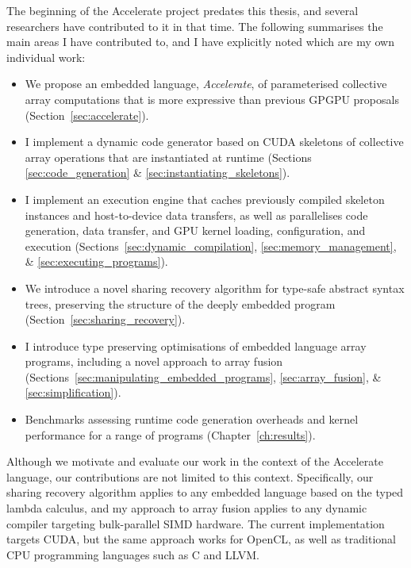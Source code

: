The beginning of the Accelerate project predates this thesis, and several
researchers have contributed to it in that time. The following summarises the
main areas I have contributed to, and I have explicitly noted which are my own
individual work:
%
\begin{itemize}
    \item We propose an embedded language, \emph{Accelerate}, of parameterised
        collective array computations that is more expressive than previous
        GPGPU proposals (Section~\ref{sec:accelerate}).

    \item I implement a dynamic code generator based on CUDA skeletons of
        collective array operations that are instantiated at runtime
        (Sections \ref{sec:code_generation} \& \ref{sec:instantiating_skeletons}).

    \item I implement an execution engine that caches previously compiled
        skeleton instances and host-to-device data transfers, as well as
        parallelises code generation, data transfer, and GPU kernel loading,
        configuration, and execution (Sections~\ref{sec:dynamic_compilation},
        \ref{sec:memory_management}, \&
        \ref{sec:executing_programs}).

    \item We introduce a novel sharing recovery algorithm for type-safe abstract
        syntax trees, preserving the structure of the deeply embedded program
        (Section~\ref{sec:sharing_recovery}).

    \item I introduce type preserving optimisations of embedded language array
        programs, including a novel approach to array fusion
        (Sections~\ref{sec:manipulating_embedded_programs},
        \ref{sec:array_fusion}, \&
        \ref{sec:simplification}).

    \item Benchmarks assessing runtime code generation overheads and kernel
        performance for a range of programs (Chapter~\ref{ch:results}).
\end{itemize}

Although we motivate and evaluate our work in the context of the Accelerate
language, our contributions are not limited to this context. Specifically, our
sharing recovery algorithm applies to any embedded language based on the typed
lambda calculus, and my approach to array fusion applies to any dynamic compiler
targeting bulk-parallel SIMD hardware. The current implementation targets CUDA,
but the same approach works for OpenCL, as well as traditional CPU programming
languages such as C and LLVM.

